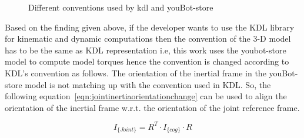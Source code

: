 \begin{figure}[h]
\centering
{}
\caption{Different conventions used by kdl and youBot-store}
\end{figure}

Based on the finding given above, if the developer wants to use the KDL library for kinematic and dynamic computations then the convention of the 3-D model has to be the same as KDL representation i.e, this work uses the youbot-store model to compute model torques hence the convention is changed according to KDL's convention as follows. The orientation of the inertial frame in the youBot-store model is not matching up with the convention used in KDL. So, the following equation~\eqref{eqn:jointinertiaorientationchange} can be used to align the orientation of the inertial frame w.r.t. the orientation of the joint reference frame.

\begin{equation}
I_{\{Joint\}} = R^T \cdot I_{\{cog\}} \cdot R
\label{eqn:jointinertiaorientationchange}
\end{equation}


